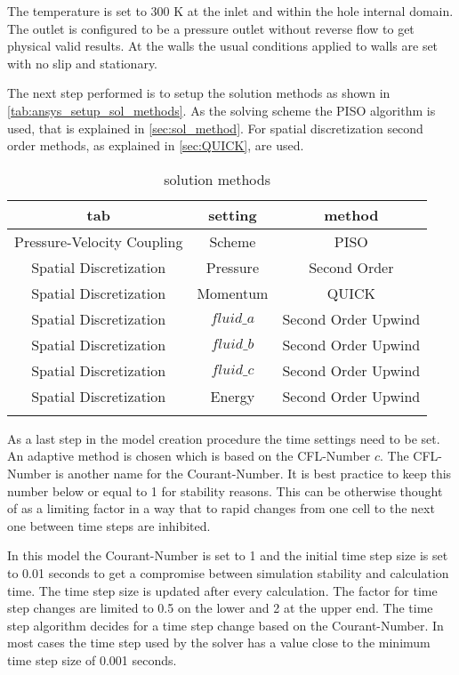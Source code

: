 \documentclass[../thesis.tex]{subfiles}
\begin{document}
The temperature is set to 300 K at the inlet and within the hole internal domain. The outlet is configured to be a pressure outlet without reverse flow to get physical valid results. At the walls the usual conditions applied to walls are set with no slip and stationary.

The next step performed is to setup the solution methods as shown in \autoref{tab:ansys_setup_sol_methods}. As the solving scheme the PISO algorithm is used, that is explained in \autoref{sec:sol_method}. For spatial discretization second order methods, as explained in \autoref{sec:QUICK}, are used. 
\begin{table} [htb]
	\centering
	\caption{solution methods}
	\begin{tabular}{ ccc }
		\hline
		tab & setting & method \\
		\hline
		Pressure-Velocity Coupling & Scheme & PISO \\
		Spatial Discretization & Pressure & Second Order \\
		Spatial Discretization & Momentum & QUICK \\
		Spatial Discretization & $fluid\_a$ & Second Order Upwind \\
		Spatial Discretization & $fluid\_b$ & Second Order Upwind \\
		Spatial Discretization & $fluid\_c$ & Second Order Upwind \\
		Spatial Discretization & Energy & Second Order Upwind \\
		\hline		
		\label{tab:ansys_setup_sol_methods}
	\end{tabular}
\end{table}

As a last step in the model creation procedure the time settings need to be set. An adaptive method is chosen which is based on the CFL-Number $c$. The CFL-Number is another name for the Courant-Number. It is best practice to keep this number below or equal to 1 for stability reasons. This can be otherwise thought of as a limiting factor in a way that to rapid changes from one cell to the next one between time steps are inhibited.
  
In this model the Courant-Number is set to 1 and the initial time step size is set to 0.01 seconds to get a compromise between simulation stability and calculation time. The time step size is updated after every calculation. The factor for time step changes are limited to 0.5 on the lower and 2 at the upper end. The time step algorithm decides for a time step change based on the Courant-Number. In most cases the time step used by the solver has a value close to the minimum time step size of 0.001 seconds. 
\end{document}

